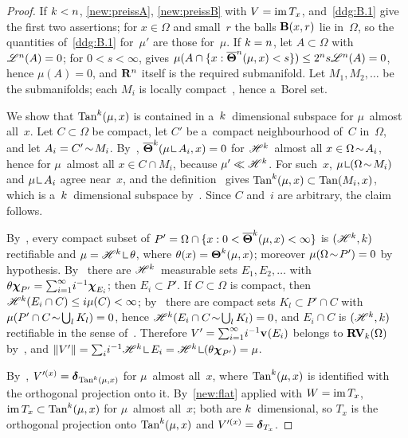 \documentclass[a4paper,twoside,leqno]{article}
\begin{document}
\begin{proof}
    If $k < n$, \ref{new:preissA}, \ref{new:preissB} with $V = \operatorname{im} T_x$,
    and~\ref{ddg:B.1} give the first two assertions; for $x \in \Omega$ and small~$r$ the balls
    $\mathbf{B}(x,r)$ lie in~$\Omega$, so the quantities of~\ref{ddg:B.1} for~$\mu'$ are those
    for~$\mu$. If $k = n$, let $A \subset \Omega$ with $\mathscr{L}^{n}(A) = 0$; for $0 < s <
    \infty$, \cite[2.10.19(1)]{Federer1969} gives $\mu(A \cap \{ x : \boldsymbol{\overline{\Theta}}^{n}(\mu,x) <
    s \}) \le 2^{n} s \mathscr{L}^{n}(A) = 0$, hence $\mu(A) = 0$, and $\mathbf{R}^{n}$ itself is the
    required submanifold. Let $M_1, M_2, \ldots$ be the submanifolds; each $M_i$ is locally
    compact~\cite[3.1.19]{Federer1969}, hence a~Borel set.

    We show that $\operatorname{Tan}^{k}(\mu,x)$ is contained in a~$k$~dimensional subspace for
    $\mu$~almost all~$x$. Let $C \subset \Omega$ be compact, let $C'$ be a~compact neighbourhood
    of~$C$ in~$\Omega$, and let $A_i = C' \!\sim\! M_i$. By~\cite[2.10.19(4)]{Federer1969},
    $\udensity^{\vdim}(\mu \restrict A_i, x) = 0$ for $\mathscr{H}^{k}$~almost all $x \in \Omega
    \!\sim\! A_i$, hence for $\mu$~almost all $x \in C \cap M_i$, because $\mu' \ll \mathscr{H}^{k}$.
    For such~$x$, $\mu \restrict (\Omega \without M_i)$ and $\mu \restrict A_i$ agree near~$x$, and
    the definition~\cite[2.8(3)]{Allard1972} gives $\operatorname{Tan}^{k}(\mu,x) \subset \operatorname{Tan}(M_i,x)$,
    which is a~$k$~dimensional subspace by~\cite[3.1.21]{Federer1969}. Since $C$ and~$i$
    are arbitrary, the claim follows.

    By~\cite[2.8(5)]{Allard1972}, every compact subset of $P' = \Omega \cap \{ x : 0 <
    \boldsymbol{\overline{\Theta}}^{k}(\mu,x) < \infty \}$ is $(\mathscr{H}^{k},k)$ rectifiable and $\mu =
    \HM^{\vdim} \restrict \theta$, where $\theta(x) = \boldsymbol{\Theta}^{k}(\mu,x)$; moreover
    $\mu(\Omega \!\sim\! P') = 0$ by hypothesis. By~\cite[2.3.3]{Federer1969} there are
    $\mathscr{H}^{k}$~measurable sets $E_1, E_2, \ldots$ with $\theta \boldsymbol{\chi}_{P'} = {\textstyle\sum_{i=1}^{\infty}}
    i^{-1} \boldsymbol{\chi}_{E_i}$; then $E_i \subset P'$. If $C \subset \Omega$ is compact, then
    $\mathscr{H}^{k}(E_i \cap C) \le i \mu(C) < \infty$; by~\cite[2.2.5]{Federer1969} there are compact
    sets $K_l \subset P' \cap C$ with $\mu(P' \cap C \!\sim\! \bigcup_l K_l) = 0$, hence
    $\mathscr{H}^{k}(E_i \cap C \!\sim\! \bigcup_l K_l) = 0$, and $E_i \cap C$ is $(\mathscr{H}^{k},k)$
    rectifiable in the sense of~\cite[2.8(4)]{Allard1972}. Therefore $V' = {\textstyle\sum_{i=1}^{\infty}}
    i^{-1} \mathbf{v}_{}(E_i)$ belongs to $\mathbf{RV}_{k}(\Omega)$ by~\cite[3.5]{Allard1972}, and $\|V'\| =
    \textsum{i}{} i^{-1} \HM^{\vdim} \restrict E_i = \HM^{\vdim} \restrict (\theta \CF{P'}) = \mu$.

    By~\cite[3.5(1)(a)]{Allard1972}, $V'^{(x)} = \boldsymbol{\delta}_{\operatorname{Tan}^{k}(\mu,x)}$ for $\mu$~almost
    all~$x$, where $\operatorname{Tan}^{k}(\mu,x)$ is identified with the orthogonal projection onto it.
    By~\ref{new:flat} applied with $W = \operatorname{im} T_x$, $\operatorname{im} T_x \subset \operatorname{Tan}^{k}(\mu,x)$ for
    $\mu$~almost all~$x$; both are $k$~dimensional, so $T_x$ is the orthogonal projection onto
    $\operatorname{Tan}^{k}(\mu,x)$ and $V'^{(x)} = \boldsymbol{\delta}_{T_x}$.
\end{proof}
\end{document}
